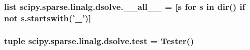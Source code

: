\subsubsection[{\+\_\+\+\_\+all\+\_\+\+\_\+}]{\setlength{\rightskip}{0pt plus 5cm}list scipy.\+sparse.\+linalg.\+dsolve.\+\_\+\+\_\+all\+\_\+\+\_\+ = \mbox{[}{\bf s} for {\bf s} in dir() {\bf if} not s.\+startswith('\+\_\+')\mbox{]}}\label{namespacescipy_1_1sparse_1_1linalg_1_1dsolve_ac7dd37dd0830e4f58008ecb5f4eac711}
\hypertarget{namespacescipy_1_1sparse_1_1linalg_1_1dsolve_a475f1f29c3c7fabbfd47640fe5db8e08}{}
\subsubsection[{test}]{\setlength{\rightskip}{0pt plus 5cm}tuple scipy.\+sparse.\+linalg.\+dsolve.\+test = Tester()}\label{namespacescipy_1_1sparse_1_1linalg_1_1dsolve_a475f1f29c3c7fabbfd47640fe5db8e08}
